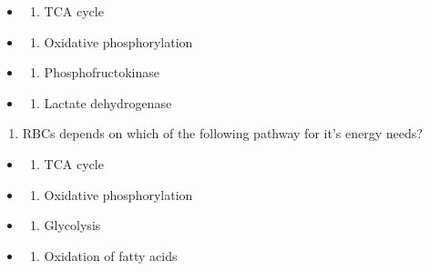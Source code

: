 \documentclass[
]{book}
\providecommand{\tightlist}{%
  \setlength{\itemsep}{0pt}\setlength{\parskip}{0pt}}
\begin{document}
\begin{itemize}
\tightlist
\item
  \begin{enumerate}
  \def\labelenumi{(\Alph{enumi})}
  \tightlist
  \item
    TCA cycle\\
  \end{enumerate}
\item
  \begin{enumerate}
  \def\labelenumi{(\Alph{enumi})}
  \setcounter{enumi}{1}
  \tightlist
  \item
    Oxidative phosphorylation\\
  \end{enumerate}
\item
  \begin{enumerate}
  \def\labelenumi{(\Alph{enumi})}
  \setcounter{enumi}{2}
  \tightlist
  \item
    Phosphofructokinase\\
  \end{enumerate}
\item
  \begin{enumerate}
  \def\labelenumi{(\Alph{enumi})}
  \setcounter{enumi}{3}
  \tightlist
  \item
    Lactate dehydrogenase
  \end{enumerate}
\end{itemize}

\begin{enumerate}
\def\labelenumi{\arabic{enumi}.}
\setcounter{enumi}{3}
\tightlist
\item
  RBCs depends on which of the following pathway for it's energy needs?
\end{enumerate}

\begin{itemize}
\tightlist
\item
  \begin{enumerate}
  \def\labelenumi{(\Alph{enumi})}
  \tightlist
  \item
    TCA cycle\\
  \end{enumerate}
\item
  \begin{enumerate}
  \def\labelenumi{(\Alph{enumi})}
  \setcounter{enumi}{1}
  \tightlist
  \item
    Oxidative phosphorylation\\
  \end{enumerate}
\item
  \begin{enumerate}
  \def\labelenumi{(\Alph{enumi})}
  \setcounter{enumi}{2}
  \tightlist
  \item
    Glycolysis\\
  \end{enumerate}
\item
  \begin{enumerate}
  \def\labelenumi{(\Alph{enumi})}
  \setcounter{enumi}{3}
  \tightlist
  \item
    Oxidation of fatty acids
  \end{enumerate}
\end{itemize}
\end{document}
